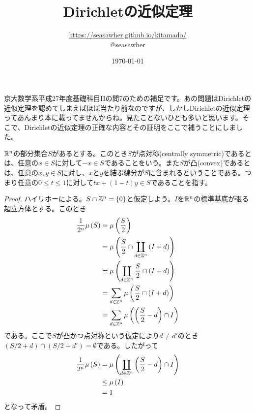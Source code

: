 \documentclass[10pt]{jsarticle}%
\begin{document}
\title{Dirichletの近似定理}
\author{ \url{https://seasawher.github.io/kitamado/}\\ @seasawher}
\date{\today}
\maketitle


京大数学系平成27年度基礎科目IIの問7のための補足です。あの問題はDirichletの近似定理を認めてしまえばほぼ当たり前なのですが、しかしDirichletの近似定理ってあんまり本に載ってませんからね。見たことないひとも多いと思います。そこで、Dirichletの近似定理の正確な内容とその証明をここで補うことにしました。



\begin{definition}
${\mathbb R}^n$の部分集合$S$があるとする。このとき$S$が点対称(centrally symmetric)であるとは、任意の$x \in S$に対して$-x \in S$であることをいう。また$S$が凸(convex)であるとは、任意の$x,y \in S$に対し、$x$と$y$を結ぶ線分が$S$に含まれるということである。つまり任意の$0 \leq t \leq 1$に対して$tx + (1-t)y \in S$であることを指す。
\end{definition}

\begin{proof}
ハイリホーによる。$S \cap {\mathbb Z}^n = \{0\}$と仮定しよう。$I$を${\mathbb R}^n$の標準基底が張る超立方体とする。このとき
\begin{align*}
\frac{1}{2^n} \mu \left( S \right) &= \mu\left(\frac{S}{2}\right) \\
&= \mu\left(\frac{S}{2} \cap \coprod_{d \in {\mathbb Z}^n} \left(I + d\right) \right) \\
&= \mu\left( \coprod_{d \in {\mathbb Z}^n}  \frac{S}{2} \cap \left(I + d\right) \right) \\
&= \sum_{d \in {\mathbb Z}^n} \mu\left(   \frac{S}{2} \cap \left(I + d\right) \right) \\
&= \sum_{d \in {\mathbb Z}^n} \mu\left(   \left(\frac{S}{2}- d\right) \cap I \right)
\end{align*}
である。ここで$S$が凸かつ点対称という仮定により$d \neq d'$のとき$(S/2 + d) \cap (S/2 + d') = \emptyset$である。したがって
\begin{align*}
\frac{1}{2^n} \mu\left(S\right) &= \mu\left(   \coprod_{d \in {\mathbb Z}^n} \left(\frac{S}{2}- d\right) \cap I \right) \\
&\leq \mu\left(I\right) \\
&= 1
\end{align*}
となって矛盾。

\end{proof}
\end{document}
